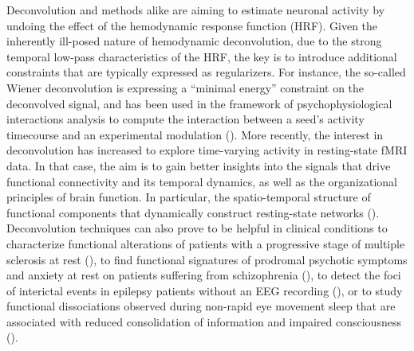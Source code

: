 Deconvolution and methods alike are aiming to estimate neuronal activity by undoing the effect of the hemodynamic response function (HRF). Given the inherently ill-posed nature of hemodynamic deconvolution, due to the strong temporal low-pass characteristics of the HRF, the key is to introduce additional constraints that are typically expressed as regularizers. For instance, the so-called Wiener deconvolution is expressing a ``minimal energy'' constraint on the deconvolved signal, and has been used in the framework of psychophysiological interactions analysis to compute the interaction between a seed's activity timecourse and an experimental modulation (\citealt{gitelman2003ModelingRegionalPsychophysiologic}). More recently, the interest in deconvolution has increased to explore time-varying activity in resting-state fMRI data. In that case, the aim is to gain better insights into the signals that drive functional connectivity and its temporal dynamics, as well as the organizational principles of brain function. In particular,  the spatio-temporal structure of functional components that dynamically construct resting-state networks (\citealt{petridou2013PeriodsRestFMRI,karahanoglu2015TransientBrainActivity,karahanoglu2017DynamicsLargescaleFMRI,kinany2020DynamicFunctionalConnectivity, gonzalez-castillo2019ImagingSpontaneousFlow,allan2015FunctionalConnectivityMRI}). Deconvolution techniques can also prove to be helpful in clinical conditions to characterize functional alterations of patients with a progressive stage of multiple sclerosis at rest (\citealt{bommarito2020FunctionalNetworkDynamicsa}), to find functional signatures of prodromal psychotic symptoms and anxiety at rest on patients suffering from schizophrenia (\citealt{zoller2019LargeScaleBrainNetwork}), to detect the foci of interictal events in epilepsy patients without an EEG recording (\citealt{lopes2012DetectionEpilepticActivity}), or to study functional dissociations observed during non-rapid eye movement sleep that are associated with reduced consolidation of information and impaired consciousness (\citealt{tarun2021NREMSleepStagesa}).

